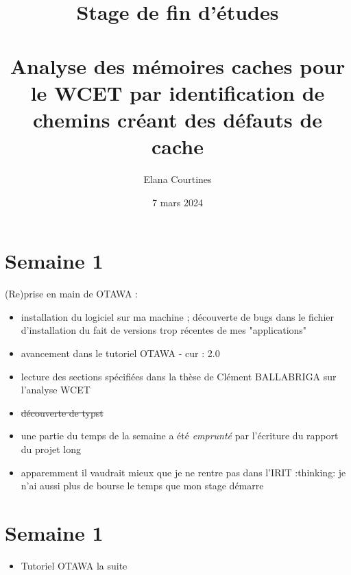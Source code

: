\documentclass[a4paper,12pt]{article}
\title{Stage de fin d'études\\ \vspace*{20mm} \scalebox{2}{Rapport d'avancement}\\ \vspace*{20mm} Analyse des mémoires caches pour le WCET par identification de chemins créant des défauts de cache}
\author{Elana Courtines}
\date{7 mars 2024}
\begin{document}
\maketitle


\section{Semaine 1}

(Re)prise en main de OTAWA :

\begin{itemize}
  \item installation du logiciel sur ma machine ; découverte de bugs dans le fichier d'installation du fait de versions trop récentes de mes "applications"
  \item avancement dans le tutoriel OTAWA - cur : 2.0
  \item lecture des sections spécifiées dans la thèse de Clément BALLABRIGA sur l'analyse WCET
  \item \sout{découverte de typst}
  \item une partie du temps de la semaine a été \textit{emprunté} par l'écriture du rapport du projet long
  \item apparemment il vaudrait mieux que je ne rentre pas dans l'IRIT :thinking: je n'ai aussi plus de bourse le temps que mon stage démarre 
\end{itemize}



\section{Semaine 1}

\begin{itemize}
  \item Tutoriel OTAWA la suite
\end{itemize}
\end{document}
